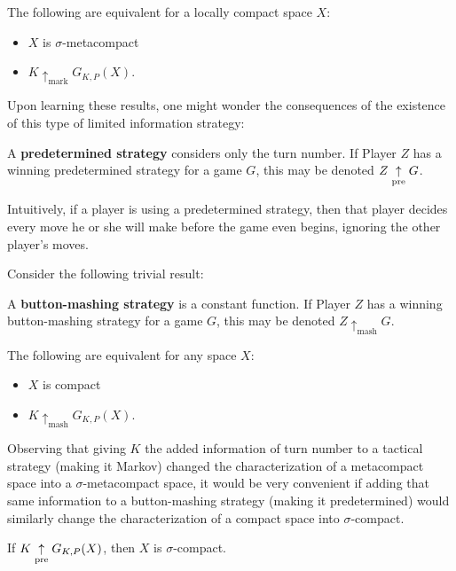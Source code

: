 \begin{theorem}
The following are equivalent for a locally compact space $X$:
    \begin{itemize}
    \item $X$ is $\sigma$-metacompact
    \item $K \uparrow_{\text{mark}}G_{K,P}(X)$.
    \end{itemize}
\end{theorem}

Upon learning these results, one might wonder the consequences of the existence of this type of limited information strategy:

\begin{definition}
A \textbf{predetermined strategy} considers only the turn number. If Player $Z$ has a winning predetermined strategy for a game $G$, this may be denoted $Z \underset{\text{pre}}{\uparrow} G$.
\end{definition}

Intuitively, if a player is using a predetermined strategy, then that player decides every move he or she will make before the game even begins, ignoring the other player's moves.

Consider the following trivial result:

\begin{definition}
A \textbf{button-mashing strategy} is a constant function. If Player $Z$ has a winning button-mashing strategy for a game $G$, this may be denoted $Z \uparrow_{\text{mash}} G$.
\end{definition}

\begin{proposition}
The following are equivalent for any space $X$:
    \begin{itemize}
    \item $X$ is compact
    \item $K \uparrow_{\text{mash}}G_{K,P}(X)$.
    \end{itemize}
\end{proposition}

Observing that giving $K$ the added information of turn number to a tactical strategy (making it Markov) changed the characterization of a metacompact space into a $\sigma$-metacompact space, it would be very convenient if adding that same information to a button-mashing strategy (making it predetermined) would similarly change the characterization of a compact space into $\sigma$-compact.

\begin{proposition}
If $K \underset{\text{pre}}{\uparrow} G_{K,P}(X)$, then $X$ is $\sigma$-compact.
\end{proposition}

